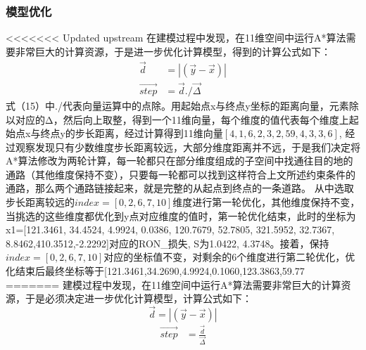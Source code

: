 \documentclass[bwprint]{gmcmthesis}
\begin{document}
\subsubsection{模型优化}
<<<<<<< Updated upstream
在建模过程中发现，在11维空间中运行A*算法需要非常巨大的计算资源，于是进一步优化计算模型，得到的计算公式如下：
\begin{align}
\vec{d }&=\left | \left ( \vec{y}-\vec{x} \right ) \right |\\
\overrightarrow{step }&= \vec{d }./{\overrightarrow{\Delta} }
\end{align}
式（15）中./代表向量运算中的点除。用起始点x与终点y坐标的距离向量，元素除以对应的Δ，然后向上取整，得到一个11维向量，每个维度的值代表每个维度上起始点x与终点y的步长距离，经过计算得到11维向量\:$[4, 1, 6, 2, 3, 2, 59, 4, 3, 3, 6]$,
经过观察发现只有少数维度步长距离较远，大部分维度距离并不远，于是我们决定将A*算法修改为两轮计算，每一轮都只在部分维度组成的子空间中找通往目的地的通路（其他维度保持不变），只要每一轮都可以找到这样符合上文所述约束条件的通路，那么两个通路链接起来，就是完整的从起点到终点的一条道路。
从中选取步长距离较远的$index=[0,2,6,7,10]$维度进行第一轮优化，其他维度保持不变，当挑选的这些维度都优化到y点对应维度的值时，第一轮优化结束，此时的坐标为
x1=[121.3461, 34.4524, 4.9924, 0.0386, 120.7679, 52.7805, 321.5952, 32.7367, 8.8462,410.3512,-2.2292]对应的RON\_损失,  S为1.0422, 4.3748。接着，保持$index=[0,2,6,7,10]$对应的坐标值不变，对剩余的6个维度进行第二轮优化，优化结束后最终坐标等于[121.3461,34.2690,4.9924,0.1060,123.3863,59.77
=======
建模过程中发现，在11维空间中运行A*算法需要非常巨大的计算资源，于是必须决定进一步优化计算模型，计算公式如下：
\begin{equation}
	\overrightarrow{d}= \left | \left ( \overrightarrow{y}-\overrightarrow{x}\right ) \right |
\end{equation}
\begin{align}
	\overrightarrow{step} & = \frac{\vec{d }}{\overrightarrow{\Delta} }  
\end{align}
\end{document}
